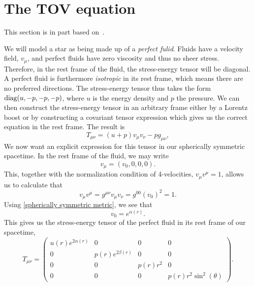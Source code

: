 \section{The TOV equation}
\label{section: TOV equation}

This section is in part based on~\autocite{carrollSpacetimeGeometryIntroduction2019,weinbergGravitationCosmologyPrinciples1972,glendenningCompactStarsNuclear2012}.

We will model a star as being made up of a \emph{perfect fulid}.
Fluids have a velocity field, $v_\mu$, and perfect fluids have zero viscosity and thus no sheer stress.
Therefore, in the rest frame of the fluid, the stress-energy tensor will be diagonal.
A perfect fluid is furthermore \emph{isotropic} in its rest frame, which means there are no preferred directions.
The stress-energy tensor thus takes the form $\operatorname{diag}(u, -p, -p, -p)$, where $u$ is the energy density and $p$ the pressure.
We can then construct the stress-energy tensor in an arbitrary frame either by a Lorentz boost or by constructing a covariant tensor expression which gives us the correct equation in the rest frame.
The result is 
%
\begin{equation}
    T_{\mu \nu} = (u + p) v_\mu v_\nu - p g_{\mu \nu},
\end{equation}
We now want an explicit expression for this tensor in our spherically symmetric spacetime.
In the rest frame of the fluid, we may write 
\begin{equation}
    v_\mu = \left(v_0, 0, 0, 0\right).
\end{equation}
This, together with the normalization condition of 4-velocities, $v_\mu v^\mu = 1$, allows us to calculate that
%
\begin{equation}
    v_\mu v^\mu = g^{\mu \nu} v_\mu v_\nu = g^{00} (v_0)^2 = 1.
\end{equation}
%
Using \autoref{spherically symmetric metric}, we see that
\begin{equation}
    v_0 = e^{\alpha(r)}.
\end{equation}
%
This gives us the stress-energy tensor of the perfect fluid in its rest frame of our spacetime,
%
\begin{equation}
    T_{\mu \nu} 
    =
    \left(
        \begin{matrix}
            u{\left(r \right)} e^{2 \alpha{\left(r \right)}} & 0 & 0 & 0\\0 & 
            p{\left(r \right)} e^{2 \beta{\left(r \right)}} & 0 & 0\\
            0 & 0 & p{\left(r \right)} r^{2} & 0\\
            0 & 0 & 0 & p{\left(r \right)} r^{2} \sin^{2}{\left(\theta \right)}
        \end{matrix}
    \right).
\end{equation}
%

